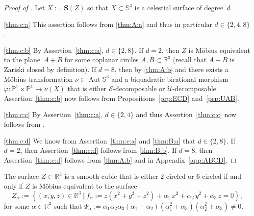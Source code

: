 \documentclass[11pt]{article}
\newcommand{\R}{\mathbb{R}}
\renewcommand{\P}{\mathbb{P}}
\renewcommand{\S}{\mathbb{S}}
\newcommand{\bS}{\mathbf{S}}
\newcommand{\cE}{\mathcal{E}}
\newcommand{\cU}{\mathcal{U}}
\renewcommand{\c}{\colon}
\newcommand{\aut}{\operatorname{Aut}}
\newcommand{\set}[2]{\left\{#1 ~|~ #2\right\}}
\newcommand{\st}{such that }
\begin{document}
\begin{proof}[Proof of ]
Let $X:=\bS(Z)$ so that
$X\subset\S^3$ is a celestial surface of degree~$d$.

\ref{thm:c:a}
This assertion follows from \ref{thm:A:a} and thus
in particular $d\in\{2,4,8\}$.

\ref{thm:c:b}
By Assertion~\ref{thm:c:a}, $d\in\{2,8\}$.
If $d=2$, then $Z$ is M\"obius equivalent to the plane~$A+B$ for some coplanar circles $A,B\subset\R^3$
(recall that $A+B$ is Zariski closed by definition).
If $d=8$, then by \ref{thm:A:b} and 
there exists a M\"obius transformation $\nu\in\aut\S^3$
and a biquadratic birational morphism $\varphi\c \P^1\times\P^1\to \nu(X)$
that is either $\cE$-decomposable or $\cU$-decomposable.
Assertion~\ref{thm:c:b} now follows from Propositions~\ref{prp:ECD} and~\ref{prp:UAB}.

\ref{thm:c:c}
By Assertion~\ref{thm:c:a}, $d\in\{2,4\}$ and thus
Assertion~\ref{thm:c:c} now follows from .

\ref{thm:c:d}
We know from Assertion~\ref{thm:c:a} and \ref{thm:B:a} that $d\in\{2,8\}$.
If $d=2$, then Assertion~\ref{thm:c:d} follows from \ref{thm:B:b}.
If $d=8$, then Assertion~\ref{thm:c:d} follows from
\ref{thm:A:b} and  in Appendix~\ref{app:ABCD}.
\end{proof}

\begin{lemma}
\label{lem:cubic}
The surface $Z\subset \R^3$ is a smooth cubic
that is either $2$-circled or $6$-circled
if and only if
$Z$ is M\"obius equivalent to the surface
\[
Z_\alpha:=\set{(x,y,z)\in\R^3}{f_\alpha:=z(x^2+y^2+z^2)+\alpha_1\,x^2+\alpha_2\,y^2+\alpha_3\,z=0},
\]
for some $\alpha\in \R^3$ \st
$\Psi_\alpha:=\alpha_1\alpha_2\alpha_3(\alpha_1-\alpha_2)(\alpha_1^2+\alpha_3)(\alpha_2^2+\alpha_3)\neq 0$.
\end{lemma}
\end{document}
